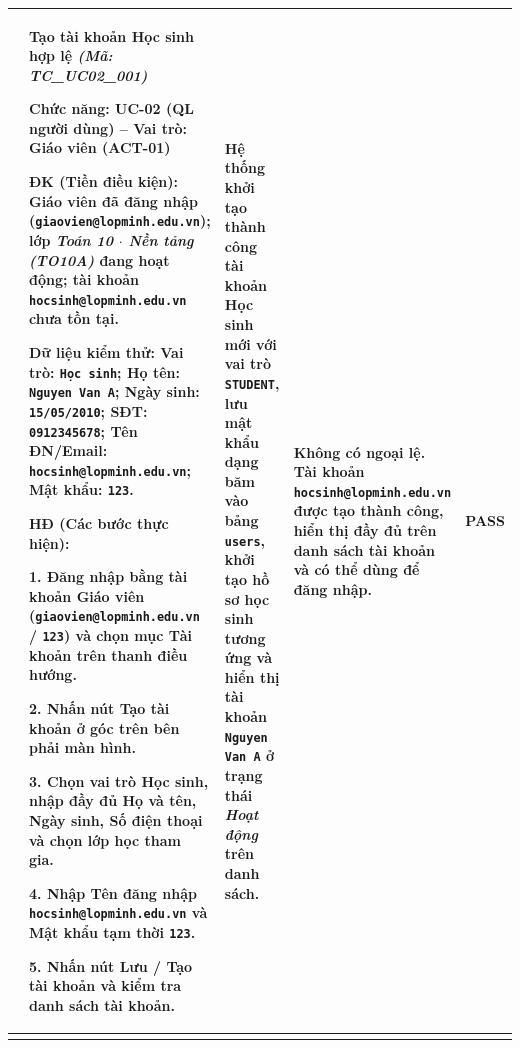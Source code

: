 \documentclass[12pt,a4paper]{report}
\newcommand{\passbadge}{\textbf{\textcolor{passgreen}{PASS}}}
\newcommand{\tcheader}[2]{%
  \textbf{#1} \textit{(Mã: #2)}\par
}
\newcommand{\tcmeta}[2]{%
  \textbf{Chức năng:} #1 -- \textbf{Vai trò:} #2\par
}
\newcommand{\tcpre}[1]{%
  \textbf{ĐK (Tiền điều kiện):} #1\par
}
\newcommand{\tcdata}[1]{%
  \textbf{Dữ liệu kiểm thử:} #1\par
}
\begin{document}
{\begin{longtable}{|C{0.8cm}|L{6.8cm}|L{3.0cm}|L{2.9cm}|C{1.2cm}|}
{%
1 &
\tcheader{Tạo tài khoản Học sinh hợp lệ}{TC\_UC02\_001}
\tcmeta{UC-02 (QL người dùng)}{Giáo viên (ACT-01)}
\tcpre{Giáo viên đã đăng nhập (\texttt{giaovien@\allowbreak lopminh.edu.vn}); lớp \textit{Toán 10 $\cdot$ Nền tảng (TO10A)} đang hoạt động; tài khoản \texttt{hocsinh@\allowbreak lopminh.edu.vn} chưa tồn tại.}
\tcdata{Vai trò: \texttt{Học sinh}; Họ tên: \texttt{Nguyen Van A}; Ngày sinh: \texttt{15/05/2010}; SĐT: \texttt{0912345678}; Tên ĐN/Email: \texttt{hocsinh@\allowbreak lopminh.edu.vn}; Mật khẩu: \texttt{123}.}
\textbf{HĐ (Các bước thực hiện):}\par
1. Đăng nhập bằng tài khoản Giáo viên (\texttt{giaovien@\allowbreak lopminh.edu.vn} / \texttt{123}) và chọn mục \textbf{Tài khoản} trên thanh điều hướng.\par
2. Nhấn nút \textbf{Tạo tài khoản} ở góc trên bên phải màn hình.\par
3. Chọn vai trò \textbf{Học sinh}, nhập đầy đủ Họ và tên, Ngày sinh, Số điện thoại và chọn lớp học tham gia.\par
4. Nhập Tên đăng nhập \texttt{hocsinh@\allowbreak lopminh.edu.vn} và Mật khẩu tạm thời \texttt{123}.\par
5. Nhấn nút \textbf{Lưu / Tạo tài khoản} và kiểm tra danh sách tài khoản.
&
Hệ thống khởi tạo thành công tài khoản Học sinh mới với vai trò \texttt{STUDENT}, lưu mật khẩu dạng băm vào bảng \texttt{users}, khởi tạo hồ sơ học sinh tương ứng và hiển thị tài khoản \texttt{Nguyen Van A} ở trạng thái \textit{Hoạt động} trên danh sách.
&
Không có ngoại lệ. Tài khoản \texttt{hocsinh@\allowbreak lopminh.edu.vn} được tạo thành công, hiển thị đầy đủ trên danh sách tài khoản và có thể dùng để đăng nhập.
&
\passbadge \\
\hline

}
\end{longtable}}
\end{document}
